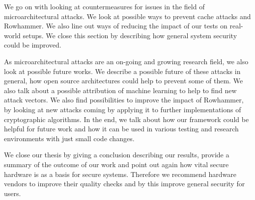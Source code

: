 We go on with looking at countermeasures for issues in the field of
microarchitectural attacks. We look at possible ways to prevent cache attacks
and Rowhammer. We also line out ways of reducing the impact of our tests on
real-world setups. We close this section by describing how general system
security could be improved.

As microarchitectural attacks are an on-going and growing research field, we
also look at possible future works. We describe a possible future of these
attacks in general, how open source architectures could help to prevent some of
them. We also talk about a possible attribution of machine learning to help to
find new attack vectors. We also find possibilities to improve the impact of
Rowhammer, by looking at new attacks coming by applying it to further
implementations of cryptographic algorithms. In the end, we talk about how our
framework could be helpful for future work and how it can be used in various
testing and research environments with just small code changes.

We close our thesis by giving a conclusion describing our results, provide a
summary of the outcome of our work and point out again how vital secure hardware
is as a basis for secure systems. Therefore we recommend hardware vendors to
improve their quality checks and by this improve general security for users.

